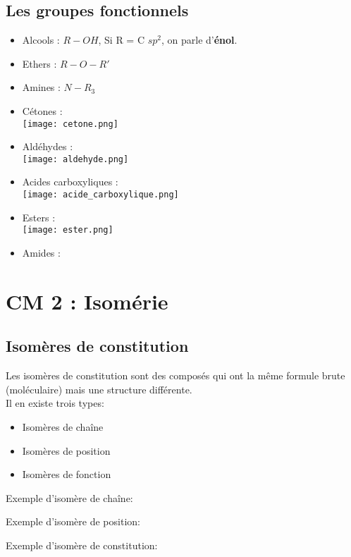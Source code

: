 \documentclass{article}
\newcommand{\insertslide}[2]{
\begin{center}
    \fbox{\texttt{[image: \#1]}}
\end{center}
}
\begin{document}
    \subsection{Les groupes fonctionnels}
        \begin{itemize}
            \item Alcools : $R-OH$, Si R = C $sp^2$, on parle d'\textbf{énol}.
            \item Ethers : $R-O-R'$
            \item Amines : $N-R_3$
            \item Cétones : \\ \texttt{[image: cetone.png]}
            \item Aldéhydes : \\\texttt{[image: aldehyde.png]}
            \item Acides carboxyliques : \\\texttt{[image: acide\_carboxylique.png]}
            \item Esters : \\\texttt{[image: ester.png]}
            \item Amides : \\
        \end{itemize}

\section{CM 2 : Isomérie}
    \subsection{Isomères de constitution}
        Les isomères de constitution sont des composés qui ont
        la même formule brute (moléculaire) mais une structure
        différente.\\
        Il en existe trois types:
        \begin{itemize}
            \item Isomères de chaîne
            \item Isomères de position
            \item Isomères de fonction
        \end{itemize}
        Exemple d'isomère de chaîne:
        \insertslide{Slides/CM2.pdf}{3}
        Exemple d'isomère de position:
        \insertslide{Slides/CM2.pdf}{4}
        Exemple d'isomère de constitution:
        \insertslide{Slides/CM2.pdf}{5}
\end{document}
